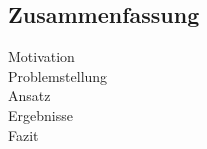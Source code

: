 \begin{otherlanguage}{ngerman}
\chapter*{Zusammenfassung}

\begin{description}
  \item[Motivation] 

  \item[Problemstellung] 

  \item[Ansatz] 

  \item[Ergebnisse] 

  \item[Fazit]
\end{description}
\end{otherlanguage}